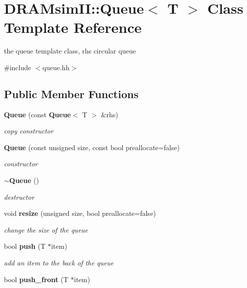 \section{DRAMsimII::Queue$<$ T $>$ Class Template Reference}
\label{class_d_r_a_msim_i_i_1_1_queue}


the queue template class, rhs circular queue  




{\ttfamily \#include $<$queue.hh$>$}

\subsection*{Public Member Functions}
\begin{DoxyCompactItemize}
\item 
{\bf Queue} (const {\bf Queue}$<$ T $>$ \&rhs)
\begin{DoxyCompactList}\small\item\em copy constructor \item\end{DoxyCompactList}\item 
{\bf Queue} (const unsigned size, const bool preallocate=false)
\begin{DoxyCompactList}\small\item\em constructor \item\end{DoxyCompactList}\item 
{\bf $\sim$Queue} ()
\begin{DoxyCompactList}\small\item\em destructor \item\end{DoxyCompactList}\item 
void {\bf resize} (unsigned size, bool preallocate=false)
\begin{DoxyCompactList}\small\item\em change the size of the queue \item\end{DoxyCompactList}\item 
bool {\bf push} (T $\ast$item)
\begin{DoxyCompactList}\small\item\em add an item to the back of the queue \item\end{DoxyCompactList}\item 
bool {\bf push\_\-front} (T $\ast$item)\label{class_d_r_a_msim_i_i_1_1_queue_ab115d3b196706625ccd45f536acf3c9f}


\end{DoxyCompactItemize}
